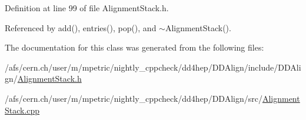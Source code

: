 Definition at line 99 of file Alignment\+Stack.\+h.



Referenced by add(), entries(), pop(), and $\sim$\+Alignment\+Stack().



The documentation for this class was generated from the following files\+:\begin{DoxyCompactItemize}
\item 
/afs/cern.\+ch/user/m/mpetric/nightly\+\_\+cppcheck/dd4hep/\+D\+D\+Align/include/\+D\+D\+Align/\hyperlink{_alignment_stack_8h}{Alignment\+Stack.\+h}\item 
/afs/cern.\+ch/user/m/mpetric/nightly\+\_\+cppcheck/dd4hep/\+D\+D\+Align/src/\hyperlink{_alignment_stack_8cpp}{Alignment\+Stack.\+cpp}\end{DoxyCompactItemize}
